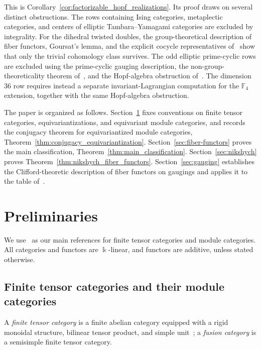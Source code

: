 \documentclass[12pt]{amsart}
\theoremstyle{plain}
\theoremstyle{definition} %
\theoremstyle{remark} %
\newcommand{\ku}{{\Bbbk}} %
\begin{document}
This is Corollary~\ref{cor:factorizable_hopf_realizations}. Its proof draws on several distinct obstructions. The rows containing Ising categories, metaplectic categories, and centers of elliptic Tambara--Yamagami categories are excluded by integrality. For the dihedral twisted doubles, the group-theoretical description of fiber functors, Goursat's lemma, and the explicit cocycle representatives of~\cite{CGR00} show that only the trivial cohomology class survives. The odd elliptic prime-cyclic rows are excluded using the prime-cyclic gauging description, the non-group-theoreticality theorem of~\cite{GPR24}, and the Hopf-algebra obstruction of~\cite{JL09}. The dimension $36$ row requires instead a separate invariant-Lagrangian computation for the $\mathbb{F}_4$ extension, together with the same Hopf-algebra obstruction.

\medskip

The paper is organized as follows. Section~\ref{sec:preliminaries} fixes conventions on finite tensor categories, equivariantizations, and equivariant module categories, and records the conjugacy theorem for equivariantized module categories, Theorem~\ref{thm:conjugacy_equivariantization}. Section~\ref{sec:fiber-functors} proves the main classification, Theorem~\ref{thm:main_classification}. Section~\ref{sec:nikshych} proves Theorem~\ref{thm:nikshych_fiber_functors}. Section~\ref{sec:gauging} establishes the Clifford-theoretic description of fiber functors on gaugings and applies it to the table of~\cite{GNradical}.


\section{Preliminaries}\label{sec:preliminaries}

We use~\cite{EGNO15, EO04} as our main references for finite tensor categories and module categories. All categories and functors are $\ku$-linear, and functors are additive, unless stated otherwise.

\subsection{Finite tensor categories and their module categories}

A \emph{finite tensor category} is a finite abelian category equipped with a rigid monoidal structure, bilinear tensor product, and simple unit~\cite[Section~2.2]{EO04}; a \emph{fusion category} is a semisimple finite tensor category.
\end{document}
